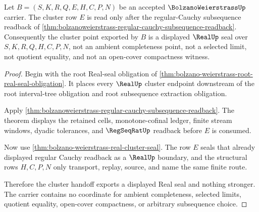 \begin{theorem}
\label{thm:bolzanoweierstrass-cluster-real-seal-handoff}
Let $B=(S,K,R,Q,E,H,C,P,N)$ be an accepted $\BolzanoWeierstrassUp$ carrier. The cluster row $E$ is read only after the regular-Cauchy subsequence readback of \autoref{thm:bolzanoweierstrass-regular-cauchy-subsequence-readback}. Consequently the cluster point exported by $B$ is a displayed $\RealUp$ seal over $S,K,R,Q,H,C,P,N$, not an ambient completeness point, not a selected limit, not quotient equality, and not an open-cover compactness witness.
\end{theorem}
\begin{proof}
Begin with the root Real-seal obligation of \autoref{thm:bolzano-weierstrass-root-real-seal-obligation}. It places every $\RealUp$ cluster endpoint downstream of the root interval-tree obligation and root subsequence extraction obligation.

Apply \autoref{thm:bolzanoweierstrass-regular-cauchy-subsequence-readback}. The theorem displays the retained cells, monotone-cofinal ledger, finite stream windows, dyadic tolerances, and $\RegSeqRatUp$ readback before $E$ is consumed.

Now use \autoref{thm:bolzano-weierstrass-real-cluster-seal}. The row $E$ seals that already displayed regular Cauchy readback as a $\RealUp$ boundary, and the structural rows $H,C,P,N$ only transport, replay, source, and name the same finite route.

Therefore the cluster handoff exports a displayed Real seal and nothing stronger. The carrier contains no coordinate for ambient completeness, selected limits, quotient equality, open-cover compactness, or arbitrary subsequence choice.
\end{proof}

